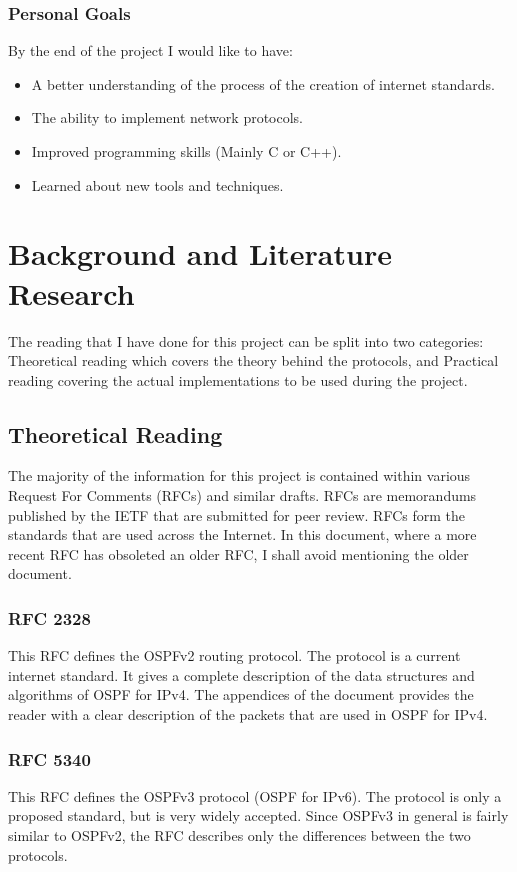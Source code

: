 \documentclass[12pt]{report}
\begin{document}
\subsection{Personal Goals}
By the end of the project I would like to have:

\begin{itemize}
	\item A better understanding of the process of the creation of internet
	standards.
	\item The ability to implement network protocols. 
	\item Improved programming skills (Mainly C or C++).
	\item Learned about new tools and techniques.
\end{itemize}

\chapter{Background and Literature Research}
The reading that I have done for this project can be split into two categories:
Theoretical reading which covers the theory behind the protocols, and Practical 
reading covering the actual implementations to be used during the project.

\section{Theoretical Reading}
The majority of the information for this project is contained within various
Request For Comments (RFCs) and similar drafts. RFCs are memorandums published
by the IETF that are submitted for peer review. RFCs form the standards that are
used across the Internet. In this document, where a more recent RFC has
obsoleted an older RFC, I shall avoid mentioning the older document. 

\subsection{RFC 2328} 
This RFC defines the OSPFv2 routing protocol. The protocol is a current internet
standard. It gives a complete description of the data structures and algorithms
of OSPF for IPv4. The appendices of the document provides the reader with a
clear description of the packets that are used in OSPF for IPv4.

\subsection{RFC 5340}
This RFC defines the OSPFv3 protocol (OSPF for IPv6). The protocol is only a
proposed standard, but is very widely accepted.  Since OSPFv3 in general is
fairly similar to OSPFv2, the RFC describes only the differences between the two
protocols. 
\end{document}
